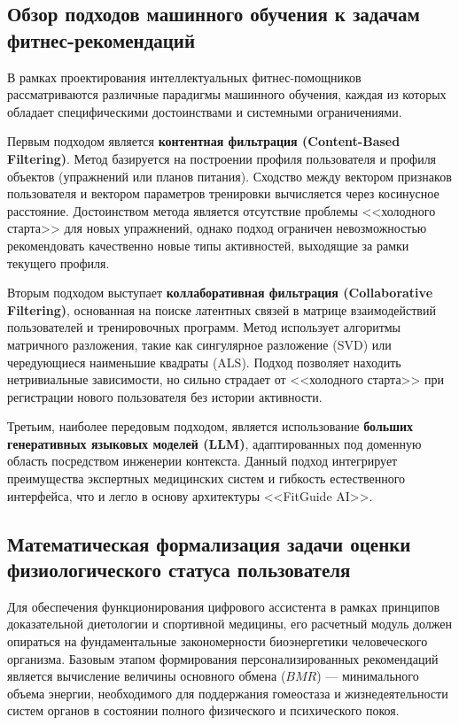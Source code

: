\documentclass[14pt, a4paper]{extarticle}
\begin{document}
\subsection{Обзор подходов машинного обучения к задачам фитнес-рекомендаций}

В рамках проектирования интеллектуальных фитнес-помощников рассматриваются различные парадигмы машинного обучения, каждая из которых обладает специфическими достоинствами и системными ограничениями.

Первым подходом является \textbf{контентная фильтрация (Content-Based Filtering)}. Метод базируется на построении профиля пользователя и профиля объектов (упражнений или планов питания). Сходство между вектором признаков пользователя и вектором параметров тренировки вычисляется через косинусное расстояние. Достоинством метода является отсутствие проблемы <<холодного старта>> для новых упражнений, однако подход ограничен невозможностью рекомендовать качественно новые типы активностей, выходящие за рамки текущего профиля.

Вторым подходом выступает \textbf{коллаборативная фильтрация (Collaborative Filtering)}, основанная на поиске латентных связей в матрице взаимодействий пользователей и тренировочных программ. Метод использует алгоритмы матричного разложения, такие как сингулярное разложение (SVD) или чередующиеся наименьшие квадраты (ALS). Подход позволяет находить нетривиальные зависимости, но сильно страдает от <<холодного старта>> при регистрации нового пользователя без истории активности.

Третьим, наиболее передовым подходом, является использование \textbf{больших генеративных языковых моделей (LLM)}, адаптированных под доменную область посредством инженерии контекста. Данный подход интегрирует преимущества экспертных медицинских систем и гибкость естественного интерфейса, что и легло в основу архитектуры <<FitGuide AI>>.

\subsection{Математическая формализация задачи оценки физиологического статуса пользователя}

Для обеспечения функционирования цифрового ассистента в рамках принципов доказательной диетологии и спортивной медицины, его расчетный модуль должен опираться на фундаментальные закономерности биоэнергетики человеческого организма. Базовым этапом формирования персонализированных рекомендаций является вычисление величины основного обмена ($BMR$) — минимального объема энергии, необходимого для поддержания гомеостаза и жизнедеятельности систем органов в состоянии полного физического и психического покоя.
\end{document}
